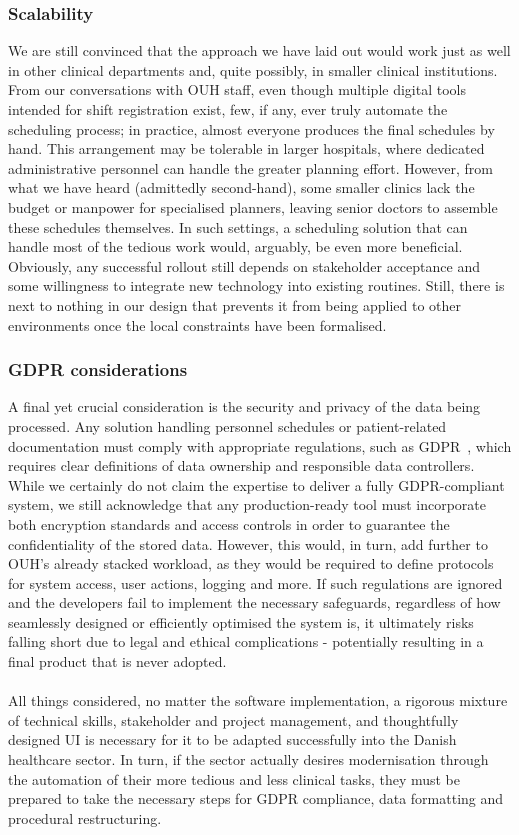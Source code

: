 \subsubsection*{Scalability}
We are still convinced that the approach we have laid out would work just as well in other clinical departments and, quite possibly, in smaller clinical institutions. From our conversations with OUH staff, even though multiple digital tools intended for shift registration exist, few, if any, ever truly automate the scheduling process; in practice, almost everyone produces the final schedules by hand. This arrangement may be tolerable in larger hospitals, where dedicated administrative personnel can handle the greater planning effort. However, from what we have heard (admittedly second-hand), some smaller clinics lack the budget or manpower for specialised planners, leaving senior doctors to assemble these schedules themselves. In such settings, a scheduling solution that can handle most of the tedious work would, arguably, be even more beneficial. Obviously, any successful rollout still depends on stakeholder acceptance and some willingness to integrate new technology into existing routines. Still, there is next to nothing in our design that prevents it from being applied to other environments once the local constraints have been formalised.

\subsubsection*{GDPR considerations}
A final yet crucial consideration is the security and privacy of the data being processed. Any solution handling personnel schedules or patient-related documentation must comply with appropriate regulations, such as GDPR~\cite{EU-GDPR}, which requires clear definitions of data ownership and responsible data controllers. While we certainly do not claim the expertise to deliver a fully GDPR-compliant system, we still acknowledge that any production-ready tool must incorporate both encryption standards and access controls in order to guarantee the confidentiality of the stored data. However, this would, in turn, add further to OUH's already stacked workload, as they would be required to define protocols for system access, user actions, logging and more. If such regulations are ignored and the developers fail to implement the necessary safeguards, regardless of how seamlessly designed or efficiently optimised the system is, it ultimately risks falling short due to legal and ethical complications - potentially resulting in a final product that is never adopted.
\\
\\
All things considered, no matter the software implementation, a rigorous mixture of technical skills, stakeholder and project management, and thoughtfully designed UI is necessary for it to be adapted successfully into the Danish healthcare sector. In turn, if the sector actually desires modernisation through the automation of their more tedious and less clinical tasks, they must be prepared to take the necessary steps for GDPR compliance, data formatting and procedural restructuring. 